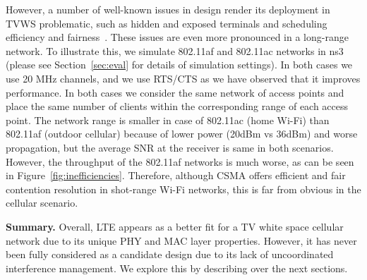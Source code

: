 However, a number of well-known issues in \wf design render its deployment in TVWS problematic, such as hidden and exposed terminals and scheduling efficiency and fairness~\cite{idle_sense}.
These issues are even more pronounced in a long-range network. To illustrate this, we simulate 802.11af and 802.11ac networks in ns3 (please see Section~\ref{sec:eval} for details of simulation settings). 
In both cases we use 20 MHz channels, and we use RTS/CTS as we have observed that it improves performance. 
In both cases we consider the same network of access points and place the same number of clients within the corresponding range of each access point. 
The network range is smaller in case of 802.11ac (home Wi-Fi) than 802.11af (outdoor cellular) because of lower power (20dBm vs 36dBm) and worse propagation, 
but the average SNR at the receiver is same in both scenarios. 
However, the throughput of the 802.11af networks is much worse, as can be seen in Figure~\ref{fig:inefficiencies}.
Therefore, although CSMA offers efficient and fair contention resolution in shot-range Wi-Fi networks, this is far from obvious in the cellular scenario.

{\bf Summary.} Overall, LTE appears as a better fit for a TV white space cellular network due to its unique PHY and MAC layer properties.
However, it has never been fully considered as a candidate design due to its lack of uncoordinated interference management. We explore this by describing \cf over the next sections.








